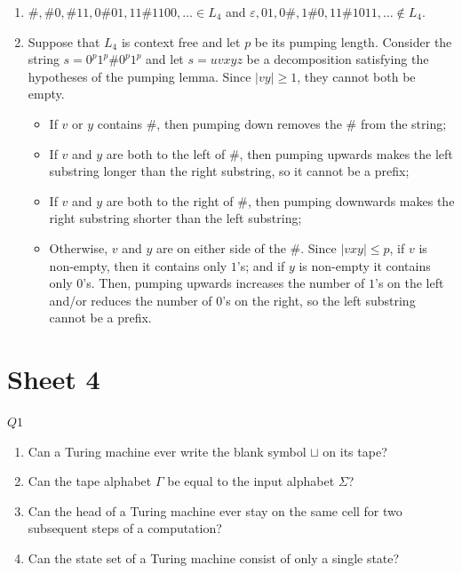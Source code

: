 \documentclass{article}
\theoremstyle{definition}
\theoremstyle{definition}
\theoremstyle{remark}
\begin{document}
\begin{enumerate}
    \item[$(i)$] $\#,\#0,\#11,0\#01,11\#1100,\ldots\in L_4$ and $\varepsilon,01,0\#,1\#0,11\#1011,\ldots\notin L_4$.
    
    \item[$(ii)$] Suppose that $L_4$ is context free and let $p$ be its pumping length. Consider the string $s=0^p1^p\#0^p1^p$ and let $s=uvxyz$ be a decomposition satisfying the hypotheses of the pumping lemma. Since $|vy|\geq1$, they cannot both be empty.
    \begin{itemize}
        \item If $v$ or $y$ contains $\#$, then pumping down removes the $\#$ from the string;
        \item If $v$ and $y$ are both to the left of $\#$, then pumping upwards makes the left substring longer than the right substring, so it cannot be a prefix;
        \item If $v$ and $y$ are both to the right of $\#$, then pumping downwards makes the right substring shorter than the left substring;
        \item Otherwise, $v$ and $y$ are on either side of the $\#$. Since $|vxy|\leq p$, if $v$ is non-empty, then it contains only $1$'s; and if $y$ is non-empty it contains only $0$'s. Then, pumping upwards increases the number of $1$'s on the left and/or reduces the number of $0$'s on the right, so the left substring cannot be a prefix.
    \end{itemize}
\end{enumerate}






\newpage

\section{Sheet 4}




\begin{questionbox}{$Q1$}
    \begin{enumerate}
        \item[$(i)$] Can a Turing machine ever write the blank symbol $\sqcup$ on its tape?
        
        \item[$(ii)$] Can the tape alphabet $\Gamma$ be equal to the input alphabet $\Sigma$?
    
        \item[$(iii)$] Can the head of a Turing machine ever stay on the same cell for two subsequent steps of a computation?
    
        \item[$(iv)$] Can the state set of a Turing machine consist of only a single state?
    \end{enumerate}
\end{questionbox}
\end{document}

